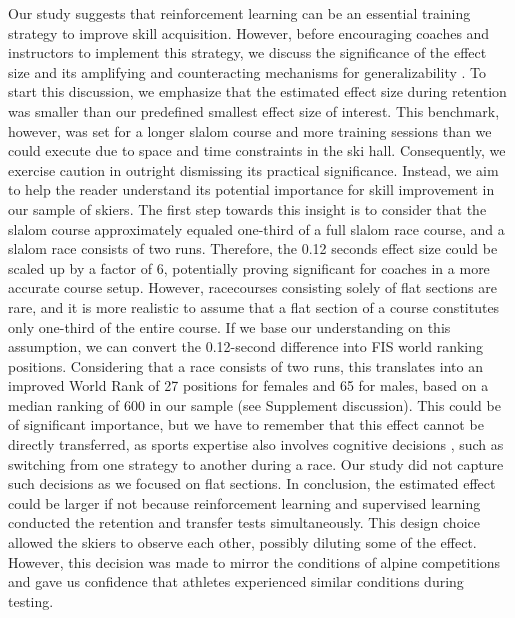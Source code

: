 Our study suggests that reinforcement learning can be an essential training strategy to improve skill acquisition. However, before encouraging coaches and instructors to implement this strategy, we discuss the significance of the effect size and its amplifying and counteracting mechanisms for generalizability \cite{anvari_not_2023}. To start this discussion, we emphasize that the estimated effect size during retention was smaller than our predefined smallest effect size of interest. This benchmark, however, was set for a longer slalom course and more training sessions than we could execute due to space and time constraints in the ski hall. Consequently, we exercise caution in outright dismissing its practical significance. Instead, we aim to help the reader understand its potential importance for skill improvement in our sample of skiers. The first step towards this insight is to consider that the slalom course approximately equaled one-third of a full slalom race course, and a slalom race consists of two runs. Therefore, the 0.12 seconds effect size could be scaled up by a factor of 6, potentially proving significant for coaches in a more accurate course setup. However, racecourses consisting solely of flat sections are rare, and it is more realistic to assume that a flat section of a course constitutes only one-third of the entire course. If we base our understanding on this assumption, we can convert the 0.12-second difference into FIS world ranking positions. Considering that a race consists of two runs, this translates into an improved World Rank of 27 positions for females and 65 for males, based on a median ranking of 600 in our sample (see Supplement discussion). This could be of significant importance, but we have to remember that this effect cannot be directly transferred, as sports expertise also involves cognitive decisions \cite{mangalam_investigating_2023, krakauer_motor_2019}, such as switching from one strategy to another during a race. Our study did not capture such decisions as we focused on flat sections. In conclusion, the estimated effect could be larger if not because reinforcement learning and supervised learning conducted the retention and transfer tests simultaneously. This design choice allowed the skiers to observe each other, possibly diluting some of the effect. However, this decision was made to mirror the conditions of alpine competitions and gave us confidence that athletes experienced similar conditions during testing. 

